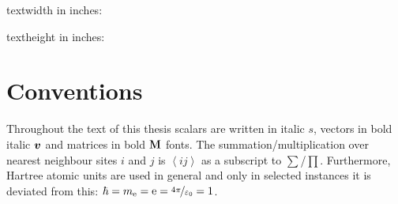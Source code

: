 \documentclass[ 10pt,
                DIV=10,
                headtopline=0.08em,
                headsepline=0.04em,
                headinclude,
                BCOR=6mm
              ]{scrbook}
\begin{document}
    
	\frontmatter

    textwidth in inches: \prntlen{\textwidth}

    textheight in inches: \prntlen{\textheight}

    \listoftodos
    \clearpage
    
    {\hypersetup{hidelinks}\tableofcontents}%

    \clearpage
    \printglossaries

    

    \section*{Conventions}
    Throughout the text of this thesis scalars are written in italic $s$, vectors in bold italic $\vb*{v}$ and matrices in bold $\textbf M$ fonts. The summation/multiplication over nearest neighbour sites $i$ and $j$ is $\left\langle ij \right\rangle$ as a subscript to $\sum$/$\prod$. Furthermore, Hartree atomic units are used in general and only in selected instances it is deviated from this: $\hbar = m_\mathrm{e} = \mathrm e = \nicefrac{4\pi}{\varepsilon_0} = 1$. 
    \nonfrenchspacing

    \mainmatter
    \renewcommand{\thechapter}{\Roman{chapter}}
    

    

    

    

    

    \cleardoublepage
    \printbibliography
\end{document}
